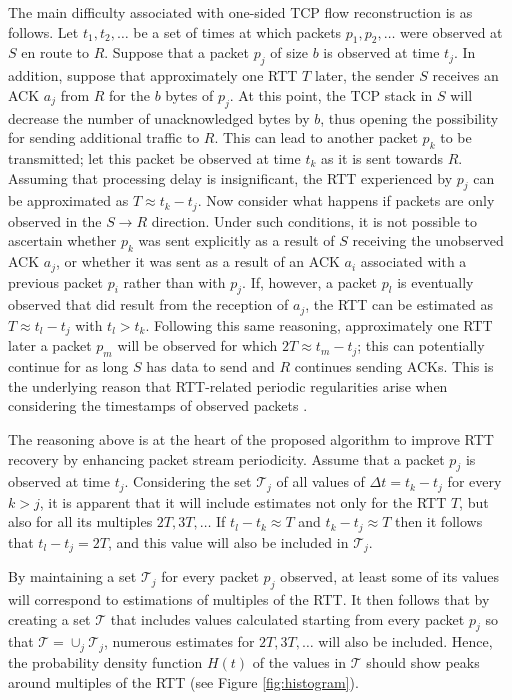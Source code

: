 %
%
The main difficulty associated with one-sided TCP flow reconstruction is as follows.
Let $t_1, t_2, \ldots$ be a set of times at which packets $p_1, p_2, \ldots$ were observed at $S$ en route to $R$.
Suppose that a packet $p_j$ of size $b$ is observed at time $t_j$.
In addition, suppose that approximately one RTT $T$ later, the sender $S$ receives an ACK $a_j$ from $R$ for the $b$ bytes of $p_j$.
At this point, the TCP stack in $S$ will decrease the number of unacknowledged bytes by $b$, thus opening the possibility for sending additional traffic to $R$.
This can lead to another packet $p_k$ to be transmitted; let this packet be observed at time $t_k$ as it is sent towards $R$.
Assuming that processing delay is insignificant, the RTT experienced by $p_j$ can be approximated as $T \approx t_k - t_j$.
Now consider what happens if packets are only observed in the $S \rightarrow R$ direction.
Under such conditions, it is not possible to ascertain whether $p_k$ was sent explicitly as a result of $S$ receiving the unobserved \ac{ACK} $a_j$, or whether it was sent as a result of an \ac{ACK} $a_i$ associated with a previous packet $p_i$ rather than with $p_j$.
If, however, a packet $p_l$ is eventually observed that did result from the reception of $a_j$, the \ac{RTT} can be estimated as $T \approx t_l - t_j$ with $t_l > t_k$.
Following this same reasoning, approximately one \ac{RTT} later a packet $p_m$ will be observed for which $2T \approx t_m - t_j$; this can potentially continue for as long $S$ has data to send and $R$ continues sending \acp{ACK}.
This is the underlying reason that \ac{RTT}-related periodic regularities arise when considering the timestamps of observed packets \cite{Qian:2009p429}.

The reasoning above is at the heart of the proposed algorithm to improve \ac{RTT} recovery by enhancing packet stream periodicity. 
Assume that a packet $p_j$ is observed at time $t_j$. 
Considering the set $\mathcal{T}_j$ of all values of $\Delta t = t_k - t_j$ for every $k > j$, it is apparent that it will include estimates not only for the \ac{RTT} $T$, but also for all its multiples $2T, 3T, \ldots$ 
If $t_l-t_k \approx T$ and $t_k - t_j \approx T$ then it follows that $t_l - t_j = 2T$, and this value will also be included in $\mathcal{T}_j$. 

By maintaining a set $\mathcal{T}_j$ for every packet $p_j$ observed, at least some of its values will correspond to estimations of multiples of the \ac{RTT}. 
It then follows that by creating a set $\mathcal{T}$ that includes values calculated starting from every packet $p_j$ so that $\mathcal{T} = \cup_j \mathcal{T}_j$, numerous estimates for $2T, 3T, \ldots$ will also be included. 
Hence, the probability density function $H(t)$ of the values in $\mathcal{T}$ should show peaks around multiples of the \ac{RTT} (see Figure \ref{fig:histogram}). 


